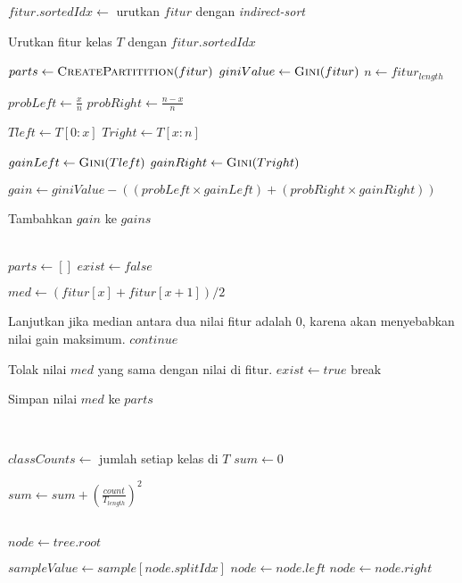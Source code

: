 \begin{center}
\begin{algorithmic}[1]
		\State $ fitur.sortedIdx \gets $ urutkan $fitur$ dengan
		\textit{indirect-sort}

		\State Urutkan fitur kelas $T$ dengan $fitur.sortedIdx$

		\State $ parts \gets \Call{CreatePartitition}{fitur} $
		\State $ giniValue \gets \Call{Gini}{fitur} $
		\State $ n \gets fitur_{length} $

			\State $ probLeft \gets \frac{x}{n} $
			\State $ probRight \gets \frac{n-x}{n} $

			\State $ Tleft \gets T[0:x] $
			\State $ Tright \gets T[x:n] $

			\State $ gainLeft \gets \Call{Gini}{Tleft} $
			\State $ gainRight \gets \Call{Gini}{Tright} $

			\State $ gain \gets giniValue - ((probLeft \times gainLeft) +
			(probRight \times gainRight)) $

			\State Tambahkan $gain$ ke $gains$
		\EndFor
	\EndFor

	\State {}
\EndFunction
\\
	\State $ parts \gets [] $
	\State $ exist \gets false $

		\State $ med \gets (fitur[x] + fitur[x+1]) / 2 $

			\Comment Lanjutkan jika median antara dua nilai fitur
			adalah 0, karena akan menyebabkan nilai gain maksimum.
			\State $continue$
		\EndIf

				\Comment Tolak nilai $med$ yang sama dengan
				nilai di fitur.
				\State $ exist \gets true $
				\State break
			\EndIf
		\EndFor

			\State Simpan nilai $med$ ke $parts$
		\EndIf
	\EndFor

	\State {}
\EndFunction
\\
		\State {}
	\EndIf

	\State $ classCounts \gets $ jumlah setiap kelas di $T$
	\State $ sum \gets 0 $

		\State $ sum \gets sum + (\frac{count}{T_{length}})^2 $
	\EndFor

	\State {}
\EndFunction
\\
	\State $ node \gets tree.root $

		\State $ sampleValue \gets sample[node.splitIdx] $
			\State $ node \gets node.left $
		\Else
			\State $ node \gets node.right $
		\EndIf
	\EndWhile

	\State {}
\EndFunction
	\end{algorithmic}
\end{center}
